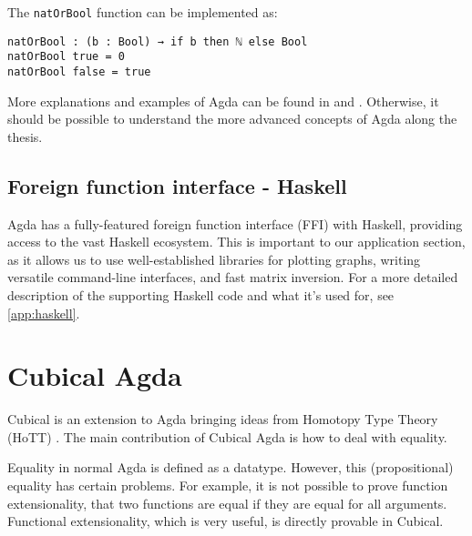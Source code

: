 The \texttt{natOrBool} function can be implemented as:
\begin{verbatim}
natOrBool : (b : Bool) → if b then ℕ else Bool
natOrBool true = 0
natOrBool false = true
\end{verbatim}

More explanations and examples of Agda can be found in \cite{agdaWebsite} and \cite{DependentTypesAtWork}. Otherwise, it should be possible to understand the more advanced concepts of Agda along the thesis.

\subsection{Foreign function interface - Haskell}
Agda has a fully-featured foreign function interface (FFI) with Haskell, providing access to the vast Haskell ecosystem. This is important to our application section, as it allows us to use well-established libraries for plotting graphs, writing versatile command-line interfaces, and fast matrix inversion. For a more detailed description of the supporting Haskell code and what it's used for, see \ref{app:haskell}.





\section{Cubical Agda}
Cubical \cite{cubicalAgdaDocs} is an extension to Agda bringing ideas from Homotopy Type Theory (HoTT) \cite{hottBook}. The main contribution of Cubical Agda is how to deal with equality.

Equality in normal Agda is defined as a datatype. However, this (propositional) equality has certain problems. For example, it is not possible to prove function extensionality, that two functions are equal if they are equal for all arguments. Functional extensionality, which is very useful, is directly provable in Cubical.


